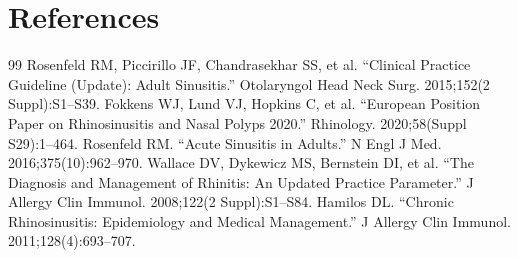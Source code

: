 \section*{References}
\begin{thebibliography}{99}
 Rosenfeld RM, Piccirillo JF, Chandrasekhar SS, et al. ``Clinical Practice Guideline (Update): Adult Sinusitis.'' Otolaryngol Head Neck Surg. 2015;152(2 Suppl):S1--S39.
 Fokkens WJ, Lund VJ, Hopkins C, et al. ``European Position Paper on Rhinosinusitis and Nasal Polyps 2020.'' Rhinology. 2020;58(Suppl S29):1--464.
 Rosenfeld RM. ``Acute Sinusitis in Adults.'' N Engl J Med. 2016;375(10):962--970.
 Wallace DV, Dykewicz MS, Bernstein DI, et al. ``The Diagnosis and Management of Rhinitis: An Updated Practice Parameter.'' J Allergy Clin Immunol. 2008;122(2 Suppl):S1--S84.
 Hamilos DL. ``Chronic Rhinosinusitis: Epidemiology and Medical Management.'' J Allergy Clin Immunol. 2011;128(4):693--707.
\end{thebibliography}

